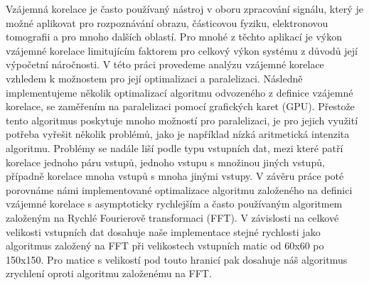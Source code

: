\documentclass[12pt]{report}
\begin{document}

Vzájemná korelace je často používaný nástroj v oboru zpracování signálu, který je možné aplikovat pro rozpoznávání obrazu, částicovou fyziku, elektronovou tomografii a pro mnoho dalších oblastí. Pro mnohé z těchto aplikací je výkon vzájemné korelace limitujícím faktorem pro celkový výkon systému z důvodů její výpočetní náročnosti. V této práci provedeme analýzu vzájemné korelace vzhledem k možnostem pro její optimalizaci a paralelizaci. Následně implementujeme několik optimalizací algoritmu odvozeného z definice vzájemné korelace, se zaměřením na paralelizaci pomocí grafických karet (GPU). Přestože tento algoritmus poskytuje mnoho možností pro paralelizaci, je pro jejich využití potřeba vyřešit několik problémů, jako je například nízká aritmetická intenzita algoritmu. Problémy se nadále liší podle typu vstupních dat, mezi které patří korelace jednoho páru vstupů, jednoho vstupu s množinou jiných vstupů, případně korelace mnoha vstupů s mnoha jinými vstupy. V závěru práce poté porovnáme námi implementované optimalizace algoritmu založeného na definici vzájemné korelace s asymptoticky rychlejším a často používaným algoritmem založeným na Rychlé Fourierově transformaci (FFT). V závislosti na celkové velikosti vstupních dat dosahuje naše implementace stejné rychlosti jako algoritmus založený na FFT při velikostech vstupních matic od 60x60 po 150x150. Pro matice s velikostí pod touto hranicí pak dosahuje náš algoritmus zrychlení oproti algoritmu založenému na FFT.
\end{document}
